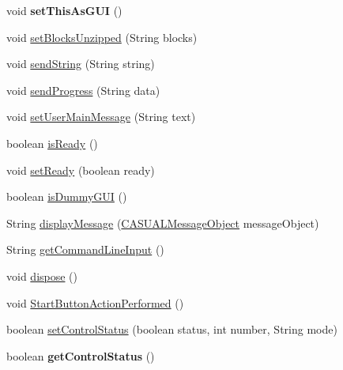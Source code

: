 \begin{DoxyCompactItemize}
\item 
\hypertarget{class_g_u_i_1_1_command_line_1_1_command_line_u_i_aa017698f930a40bedeffb51797496dc8}{void {\bfseries set\-This\-As\-G\-U\-I} ()}\label{class_g_u_i_1_1_command_line_1_1_command_line_u_i_aa017698f930a40bedeffb51797496dc8}

\item 
void \hyperlink{class_g_u_i_1_1_command_line_1_1_command_line_u_i_a022a1424d56e1022bc51548f39a65cdf}{set\-Blocks\-Unzipped} (String blocks)
\item 
void \hyperlink{class_g_u_i_1_1_command_line_1_1_command_line_u_i_a89eed0c4a9870d55d0378b5ab67a2496}{send\-String} (String string)
\item 
void \hyperlink{class_g_u_i_1_1_command_line_1_1_command_line_u_i_a1d67f6028e90f0439c633ca18382aefe}{send\-Progress} (String data)
\item 
void \hyperlink{class_g_u_i_1_1_command_line_1_1_command_line_u_i_a6437b5a62a4805cc6e1d9651cc5db5ef}{set\-User\-Main\-Message} (String text)
\item 
boolean \hyperlink{class_g_u_i_1_1_command_line_1_1_command_line_u_i_ae8c123e2111ae3e8e932711b1e0a24de}{is\-Ready} ()
\item 
void \hyperlink{class_g_u_i_1_1_command_line_1_1_command_line_u_i_a8bb70425f02ef99eb78fa56c47c57bd6}{set\-Ready} (boolean ready)
\item 
boolean \hyperlink{class_g_u_i_1_1_command_line_1_1_command_line_u_i_a2fcd587d1c6964c1f9bf825a1c0b66f0}{is\-Dummy\-G\-U\-I} ()
\item 
String \hyperlink{class_g_u_i_1_1_command_line_1_1_command_line_u_i_aba302bad91443fca75505de00bfd1a11}{display\-Message} (\hyperlink{class_c_a_s_u_a_l_1_1_c_a_s_u_a_l_message_object}{C\-A\-S\-U\-A\-L\-Message\-Object} message\-Object)
\item 
String \hyperlink{class_g_u_i_1_1_command_line_1_1_command_line_u_i_a3255f4c1749cc1795024dba0b4b15662}{get\-Command\-Line\-Input} ()
\item 
void \hyperlink{class_g_u_i_1_1_command_line_1_1_command_line_u_i_a15841dee3f6f7fea6fdb1e81753ea205}{dispose} ()
\item 
void \hyperlink{class_g_u_i_1_1_command_line_1_1_command_line_u_i_a43e58349a26d9f66a6fa8e69bcc34a58}{Start\-Button\-Action\-Performed} ()
\item 
boolean \hyperlink{class_g_u_i_1_1_command_line_1_1_command_line_u_i_abe91cb382d3a156e662780c4255723f9}{set\-Control\-Status} (boolean status, int number, String mode)
\item 
\hypertarget{class_g_u_i_1_1_command_line_1_1_command_line_u_i_a5e318f7f024f84f03da8c97fced75913}{boolean {\bfseries get\-Control\-Status} ()}\label{class_g_u_i_1_1_command_line_1_1_command_line_u_i_a5e318f7f024f84f03da8c97fced75913}


\end{DoxyCompactItemize}
